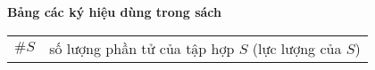 \textbf{Bảng các ký hiệu dùng trong sách}

\begin{table}[h]
    \begin{tabular}{c c}
        $\# S$ & số lượng phần tử của tập hợp $S$ (lực lượng của $S$)
    \end{tabular}
\end{table}

\newpage